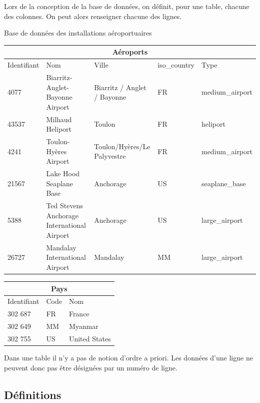 \documentclass[10pt]{article}
\begin{document}
Lors de la conception de la base de données, on définit, pour une table, chacune des colonnes. On peut alors renseigner chacune des lignes. 

\begin{exemple}
Base de données des installations aéroportuaires
\begin{center}
\begin{tabular}{lp{4cm}p{3cm}ll}
\hline
\multicolumn{5}{c}{Aéroports} \\
\hline
Identifiant & Nom & Ville & iso\_country & Type \\
\hline
\hline
4077 &Biarritz-Anglet-Bayonne Airport & Biarritz / Anglet / Bayonne & FR &  medium\_airport \\
43537 &Milhaud Heliport & Toulon & FR  & heliport \\
4241 &Toulon-Hyères Airport & Toulon/Hyères/Le Palyvestre & FR &  medium\_airport \\
21567 &Lake Hood Seaplane Base & Anchorage & US &   seaplane\_base\\
5388 &Ted Stevens Anchorage International Airport & Anchorage & US & large\_airport\\
26727 &Mandalay International Airport & Mandalay & MM  & large\_airport\\
\hline
\end{tabular}
\end{center}

\begin{center}
\begin{tabular}{lll}
\hline
\multicolumn{3}{c}{Pays} \\
\hline
Identifiant & Code & Nom \\
\hline
\hline
302 687 & FR & France \\
302 649 & MM & Myanmar \\
302 755 & US & United States \\
\hline
\end{tabular}
\end{center}
\end{exemple}

\begin{rem}
Dans une table il n'y a pas de notion d'ordre a priori. Les données d'une ligne ne peuvent donc pas être désignées par un numéro de ligne.
\end{rem}

\subsection{Définitions \cite{2}}
\end{document}
